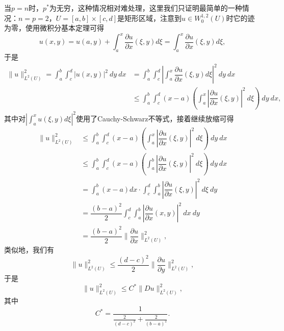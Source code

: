 \documentclass[a4paper,10pt]{ctexart}
\begin{document}
当$ p=n $时，$ p^* $为无穷，这种情况相对难处理，这里我们只证明最简单的一种情况：$ n = p =2 $，$ U = [a,b]\times [c,d] $是矩形区域，注意到$ u\in W^{1,2}_0(U) $时它的迹为零，使用微积分基本定理可得
\[
    u(x,y) = u(a,y) + \int_a^x \dfrac{\partial u}{\partial x}(\xi,y)d\xi = \int_a^x \dfrac{\partial u}{\partial x}(\xi,y)d\xi,
\]
于是
\[
    \begin{aligned}
        \| u \|_{L^2(U)}^2 = \int_a^b \int_c^d |u(x,y)|^2 \ dy \ dx & = \int_a^b \int_c^d \left| \int_a^x \dfrac{\partial u}{\partial x}(\xi,y)d\xi \right|^2 \ dy \ dx \\
        &\leqslant \int_a^b \int_c^d (x-a) \left( \int_a^x |\dfrac{\partial u}{\partial x}(\xi,y)|^2 \ d\xi \right) \ dy \ dx,
    \end{aligned}
\]
其中对$ \left| \int_a^x u(\xi,y)d\xi \right|^2 $使用了Cauchy-Schwarz不等式，接着继续放缩可得
\[
    \begin{aligned}
        \| u \|_{L^2(U)}^2 &\leqslant \int_a^b \int_c^d (x-a) \left( \int_a^x |\dfrac{\partial u}{\partial x}(\xi,y)|^2 \ d\xi \right) \ dy \ dx \\
        &\leqslant \int_a^b \int_c^d (x-a) \left( \int_a^b |\dfrac{\partial u}{\partial x}(\xi,y)|^2 \ d\xi \right) \ dy \ dx \\
        &= \int_a^b (x-a) dx \cdot \int_c^d \int_a^b |\dfrac{\partial u}{\partial x}(\xi,y)|^2 \ d\xi \ dy \\
        &= \dfrac{(b-a)^2}{2} \int_c^d \int_a^b |\dfrac{\partial u}{\partial x}(x,y)|^2 \ dx \ dy \\
        &= \dfrac{(b-a)^2}{2} \| \dfrac{\partial u}{\partial x} \|_{L^2(U)}^2,
    \end{aligned}
\]
类似地，我们有
\[
    \| u \|_{L^2(U)}^2 \leqslant \dfrac{(d-c)^2}{2} \| \dfrac{\partial u}{\partial y} \|_{L^2(U)}^2,
\]
于是
\begin{equation}
    \| u \|_{L^2(U)}^2 \leqslant C^* \| Du \|_{L^2(U)}^2,
\end{equation}
其中
\[
    C^* = \frac{1}{\frac{2}{(d-c)^2} + \frac{2}{(b-a)^2} }.
\]
\end{document}
